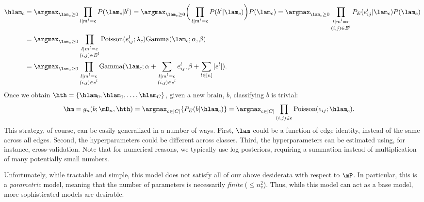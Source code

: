 \begin{align}
	\hlam_c &= \argmax_{\lam_c \geq 0}  \prod_{l | m^l = c} P(\lam_c | b^l) = \argmax_{\lam_c \geq 0}  \bigg(\prod_{l | m^l=c} P(b^l | \lam_c)\bigg) P(\lam_c) = \argmax_{\lam_c \geq 0}     \prod_{\substack{l | m^l = c \\ (i,j) \in E^l}} P_E(e^l_{ij} | \lam_c) P(\lam_c)\nonumber \\
	&= \argmax_{\lam_c \geq 0} \prod_{\substack{l | m^l = c \\ (i,j) \in E^l}}  \text{Poisson}(e^l_{ij}; \lambda_c) \text{Gamma}(\lam_c; \alpha, \beta) \nonumber \\ 
	&= \argmax_{\lam_c \geq 0} \prod_{\substack{l | m^l = c \\ (i,j) \in e^l}} \text{Gamma}(\lam_c; \alpha + \sum_{\substack{l | m^l = c \\ (i,j)\in e^l}} e^l_{ij}, \beta + \sum_{l \in [n]}|e^l| ).
\end{align}
Once we obtain $\hth=\{\hlam_0,\hlam_1,\ldots, \hlam_C\}$, given a new brain, $b$, classifying $b$ is trivial:
\begin{align}
	\hm &= g_n(b; \mD_n, \hth) = \argmax_{c \in [C]} \{P_E(b | \hlam_c)\} %
	= \argmax_{c\in[C]} \prod_{(i,j)\in e}\text{Poisson}(e_{ij}; \hlam_c).
\end{align}
This strategy, of course, can be easily generalized in a number of ways.  First, $\lam$ could be a function of edge identity, instead of the same across all edges.  Second, the hyperparameters could be different across classes.  Third,  the hyperparameters can be estimated using, for instance, cross-validation.  Note that for numerical reasons, we typically use log posteriors, requiring a summation instead of multiplication of many potentially small numbers.


Unfortunately, while tractable and simple, this model does not satisfy all of our above desiderata with respect to $\mP$.  In particular, this is a \emph{parametric} model, meaning that the number of parameters is necessarily \emph{finite} ($\leq n_v^2$).  Thus, while this model can act as a \naive base model, more sophisticated models are desirable.  



